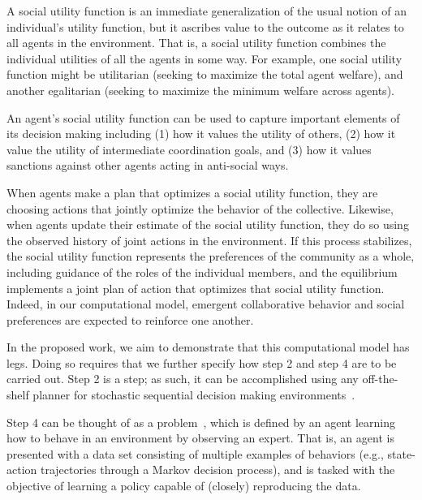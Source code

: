 A social utility function is an immediate generalization of the usual
notion of an individual's utility function, but it ascribes value to
the outcome as it relates to all agents in the environment.  That is,
a social utility function combines the individual utilities of all the
agents in some way.  For example, one social utility function might be
utilitarian (seeking to maximize the total agent welfare), and another
egalitarian (seeking to maximize the minimum welfare across agents).

An agent's social utility function can be used to capture important elements of its 
decision making including (1) how it values the utility of others, (2) how it value 
the utility of intermediate coordination goals, and (3) how it values sanctions against
other agents acting in anti-social ways.

When agents make a plan that optimizes a social utility function, they
are choosing actions that jointly optimize the behavior of the
collective.
Likewise, when
agents update their estimate of the social utility function, they do
so using the observed history of joint actions in the environment.
If this process stabilizes, the social utility function represents the
preferences of the community as a whole, including guidance of
the roles of the individual members, and the equilibrium
implements a joint plan of action that optimizes that social utility
function.  Indeed, in our computational model, emergent collaborative
behavior and social preferences are expected to reinforce one another.

In the proposed work, we aim to demonstrate that this computational
model has legs.  Doing so requires that we further specify how step 2
and step 4 are to be carried out.  Step 2 is a  step;
as such, it can be accomplished using any off-the-shelf planner for
stochastic sequential decision making environments~\cite{bellman57,Barto95,collins95,boutilier99,kearns99b,kocsis06}.

Step 4 can be thought of as a 
problem~\cite{argall09}, which is defined by 
an agent learning how to behave
in an environment by observing an expert.  That is, an agent is
presented with a data set consisting of multiple examples of behaviors
(e.g., state-action trajectories through a Markov decision process),
and is tasked with the objective of learning a policy capable of
(closely) reproducing the data.

